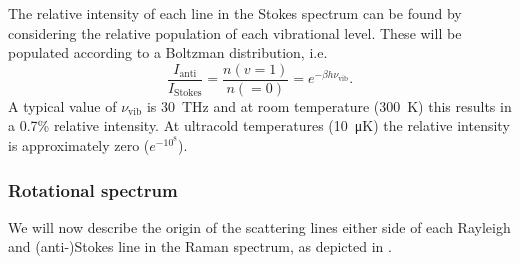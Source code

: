 The relative intensity of each line in the Stokes spectrum can be found by
considering the relative population of each vibrational level. These will be
populated according to a Boltzman distribution, i.e.
%
\begin{equation}
  \frac{I_\text{anti}}{I_\text{Stokes}} = \frac{n(v=1)}{n(=0)} = e^{-\beta h
  \nu_\text{vib}}.
\end{equation}
%
A typical value of $\nu_\text{vib}$ is \SI{30}{\tera\hertz} and at room
temperature (\SI{300}{\kelvin}) this results in a 0.7\% relative intensity. At
ultracold temperatures (\SI{10}{\micro \kelvin}) the relative intensity is
approximately zero ($e^{- 10^8}$).

\subsubsection{Rotational spectrum}

We will now describe the origin of the scattering lines either side of each
Rayleigh and (anti-)Stokes line in the Raman spectrum, as depicted in
. 
